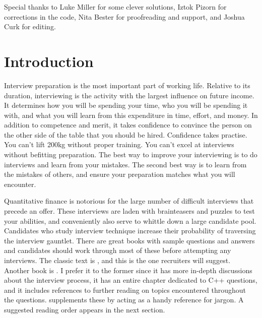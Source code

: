 \documentclass[a4paper]{article}
\begin{document}
\vfill
\noindent
Special thanks to Luke Miller for some clever solutions, Iztok Pizorn for corrections in the code, Nita Bester for proofreading and support, and Joshua Curk for editing.


\clearpage

\setcounter{tocdepth}{2}
\tableofcontents

\clearpage

\renewcommand{\thepage}{\arabic{page}}
\setcounter{page}{1}

{}
\section*{Introduction}

Interview preparation is the most important part of working life.
Relative to its duration, interviewing is the activity with the largest influence on future income.
It determines how you will be spending your time, who you will be spending it with, and what you will learn from this expenditure in time, effort, and money.
In addition to competence and merit, it takes confidence to convince the person on the other side of the table that you should be hired.
Confidence takes practise.
You can't lift 200kg without proper training.
You can't excel at interviews without befitting preparation.
The best way to improve your interviewing is to do interviews and learn from your mistakes.
The second best way is to learn from the mistakes of others, and ensure your preparation matches what you will encounter.


Quantitative finance is notorious for the large number of difficult interviews that precede an offer.
These interviews are laden with brainteasers and puzzles to test your abilities, and conveniently also serve to whittle down a large candidate pool.
Candidates who study interview technique increase their probability of traversing the interview gauntlet.
There are great books with sample questions and answers and candidates should work through most of these before attempting any interviews.
The classic text is \citet{HeardOnTheStreet}, and this is the one recruiters will suggest.
Another book is \citet{JoshiQA}.
I prefer it to the former since it has more in-depth discussions about the interview process, it has an entire chapter dedicated to C++ questions, and it includes references to further reading on topics encountered throughout the questions.
\citet{WilmottFAQ} supplements these by acting as a handy reference for jargon.
A suggested reading order appears in the next section.
\end{document}
